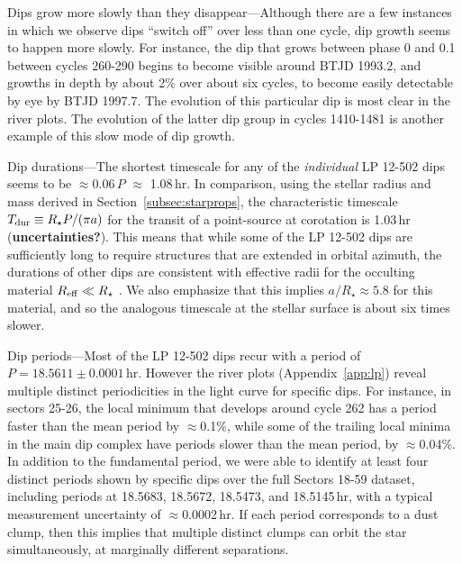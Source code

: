 \documentclass[11pt,twocolumn,tighten]{aastex63}
\begin{document}
{\sc Dips grow more slowly than they disappear}---Although there are a
few instances in which we observe dips ``switch off'' over less
than one cycle, dip growth seems to happen more slowly.  For instance,
the dip that grows between phase 0 and 0.1 between cycles 260-290
begins to become visible around BTJD 1993.2, and growths in depth by
about 2\% over about six cycles, to become easily detectable by eye by
BTJD 1997.7.  The evolution of this particular dip is most clear in
the river plots.  The evolution of the latter dip group in cycles
1410-1481 is another example of this slow mode of dip growth.

{\sc Dip durations}---The shortest timescale for any of the {\it
individual} LP 12-502 dips seems to be $\approx$0.06\,$P$ $\approx$
1.08\,hr.  In comparison, using the stellar radius and mass derived in
Section~\ref{subsec:starprops}, the characteristic timescale $T_{\rm
dur} \equiv R_\star P / (\pi a)$ for the transit of a point-source at
corotation is 1.03\,hr ({\bf uncertainties?}).  This means that while
some of the LP 12-502 dips are sufficiently long to require structures
that are extended in orbital azimuth, the durations of other dips are
consistent with effective radii for the occulting material $R_{\rm
eff} \ll R_\star$ .
We also emphasize that this implies $a/R_\star \approx 5.8$ for this
material, and so the analogous timescale at the stellar surface is
about six times slower.

{\sc Dip periods}---Most of the LP 12-502 dips recur with a period of
$P=18.5611 \pm 0.0001$\,hr.  However the river plots
(Appendix~\ref{app:lp}) reveal multiple distinct periodicities in the
light curve for specific dips.  For instance, in sectors 25-26, the
local minimum that develops around cycle 262 has a period faster than
the mean period by $\approx$0.1\%, while some of the trailing local
minima in the main dip complex have periods slower than the mean
period, by $\approx$0.04\%.  In addition to the fundamental period, we
were able to identify at least four distinct periods shown by specific
dips over the full Sectors 18-59 dataset, including periods at
18.5683, 18.5672, 18.5473, and 18.5145\,hr, with a typical measurement
uncertainty of $\approx$0.0002\,hr.
If each period corresponds to a dust clump, then this implies that
multiple distinct clumps can orbit the star simultaneously, at
marginally different separations.
\end{document}
